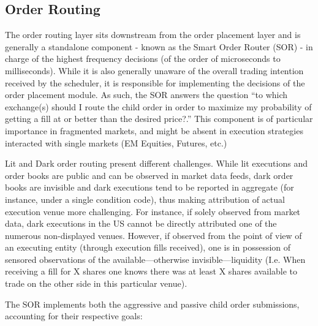 \subsection{Order Routing}

The order routing layer sits downstream from the order placement layer and is generally a standalone component - known as the Smart Order Router (SOR) - in charge of the highest frequency decisions (of the order of microseconds to milliseconds). While it is also generally unaware of the overall trading intention received by the scheduler, it is responsible for implementing the decisions of the order placement module. As such, the SOR answers the question ``to which exchange(s) should I route the child order in order to maximize my probability of getting a fill at or better than the desired price?.'' This component is of particular importance in fragmented markets, and might be absent in execution strategies interacted with single markets (EM Equities, Futures, etc.)


Lit and Dark order routing present different challenges. While lit executions and order books are public and can be observed in market data feeds, dark order books are invisible and dark executions tend to be reported in aggregate (for instance, under a single condition code), thus making attribution of actual execution venue more challenging. For instance, if solely observed from market data, dark executions in the US cannot be directly attributed one of the numerous non-displayed venues. However, if observed from the point of view of an executing entity (through execution fills received), one is in possession of sensored observations of the available---otherwise invisible---liquidity (I.e. When receiving a fill for X shares one knows there was at least X shares available to trade on the other side in this particular venue). 


The SOR implements both the aggressive and passive child order submissions, accounting for their respective goals:

